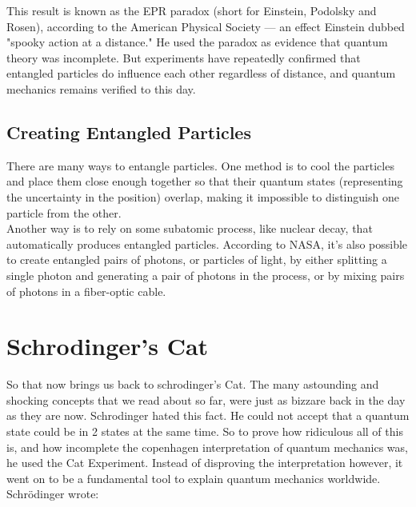 \documentclass[11pt]{article}
\begin{document}
This result is known as the EPR paradox (short for Einstein, Podolsky and Rosen), according to the American Physical Society — an effect Einstein dubbed "spooky action at a distance." He used the paradox as evidence that quantum theory was incomplete. But experiments have repeatedly confirmed that entangled particles do influence each other regardless of distance, and quantum mechanics remains verified to this day.

\subsection{Creating Entangled Particles}

There are many ways to entangle particles. One method is to cool the particles and place them close enough together so that their quantum states (representing the uncertainty in the position) overlap, making it impossible to distinguish one particle from the other.\\

Another way is to rely on some subatomic process, like nuclear decay, that automatically produces entangled particles. According to NASA, it's also possible to create entangled pairs of photons, or particles of light, by either splitting a single photon and generating a pair of photons in the process, or by mixing pairs of photons in a fiber-optic cable.

\section{Schrodinger's Cat}

So that now brings us back to schrodinger's Cat. The many astounding and shocking concepts that we read about so far, were just as bizzare back in the day as they are now.
Schrodinger hated this fact. He could not accept that a quantum state could be in 2 states at the same time. So to prove how ridiculous all of this is, and how incomplete the copenhagen interpretation of quantum mechanics was, he used the Cat Experiment. Instead of disproving the interpretation however, it went on to be a fundamental tool to 
explain quantum mechanics worldwide. \\

Schrödinger wrote:\\
\end{document}
